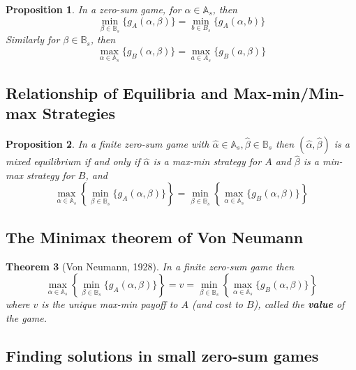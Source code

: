 \documentclass[11pt]{article}
\theoremstyle{plain}
\newtheorem{theorem}{Theorem}[section]
\newtheorem{proposition}[theorem]{Proposition}
\theoremstyle{definition}
\theoremstyle{remark}
\begin{document}
\begin{proposition}
    In a zero-sum game, for \(\alpha \in \mathbb{A}_{s}\), then
    \[
        \mathop{\min}_{\beta \in \mathbb{B}_{s}}\{ g_{A}(\alpha,\beta)\} = \mathop{\min}_{b \in B_{s}}\{ g_{A}(\alpha,b)\}
    \]
    Similarly for \(\beta \in \mathbb{B}_{s}\), then
    \[
        \mathop{\max}_{\alpha \in \mathbb{A}_{s}}\{ g_{B}(\alpha,\beta)\} = \mathop{\max}_{a \in A_{s}}\{ g_{B}(a,\beta)\}
    \]
\end{proposition}

\subsection{Relationship of Equilibria and Max-min/Min-max Strategies}

\begin{proposition}
    In a finite zero-sum game with \(\hat{\alpha} \in \mathbb{A}_{s}, \hat{\beta} \in \mathbb{B}_{s}\) then \((\hat{\alpha},\hat{\beta}) \) is a mixed equilibrium if and only if \(\hat{\alpha} \) is a max-min strategy for \(A\) and \(\hat{\beta} \) is a min-max strategy for \(B\), and
    \[
        \mathop{\max}_{\alpha \in \mathbb{A}_{s}} \left\{ 
            \mathop{\min}_{\beta \in \mathbb{B}_{s}}\{ g_{A}(\alpha,\beta)\}
        \right\} 
        = 
        \mathop{\min}_{\beta \in \mathbb{B}_{s}} \left\{ 
            \mathop{\max}_{\alpha \in \mathbb{A}_{s}}\{ g_{B}(\alpha,\beta)\}
        \right\}
    \]
\end{proposition}

\subsection{The Minimax theorem of Von Neumann}

\begin{theorem}[Von Neumann, 1928]
    In a finite zero-sum game then
    \[
        \mathop{\max}_{\alpha \in \mathbb{A}_{s}} \left\{ 
            \mathop{\min}_{\beta \in \mathbb{B}_{s}}\{ g_{A}(\alpha,\beta)\}
        \right\} 
        = v =
        \mathop{\min}_{\beta \in \mathbb{B}_{s}} \left\{ 
            \mathop{\max}_{\alpha \in \mathbb{A}_{s}}\{ g_{B}(\alpha,\beta)\}
        \right\}
    \]
    where \(v\) is the unique max-min payoff to \(A\) (and cost to \(B\)), called the \textbf{value} of the game.
\end{theorem}


\subsection{Finding solutions in small zero-sum games}
\end{document}
